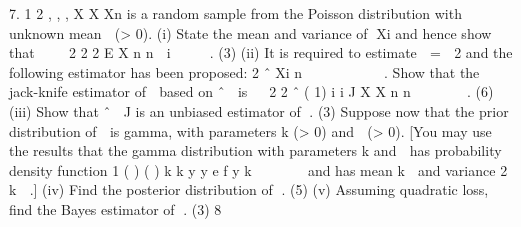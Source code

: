 
7.
1 2 , , , X X Xn
is a random sample from the Poisson distribution with unknown mean
 (> 0).
(i) State the mean and variance of
Xi
and hence show that
  
2 2 2 E X n n  i     .
(3)
(ii) It is required to estimate  = 
2
and the following estimator has been proposed:
2
ˆ
Xi
n

 
    
 .
Show that the jack-knife estimator of  based on
ˆ

is
 
2 2
ˆ
( 1)
i i
J
X X
n n




  .
(6)
(iii) Show that
ˆ
 J
is an unbiased estimator of .
(3)
Suppose now that the prior distribution of  is gamma, with parameters k (> 0) and
 (> 0). [You may use the results that the gamma distribution with parameters k and
 has probability density function
1
( )
( )
k k y y e f y
k
 
 


and has mean
k

and variance
2
k

.]
(iv) Find the posterior distribution of .
(5)
(v) Assuming quadratic loss, find the Bayes estimator of .
(3)
8
